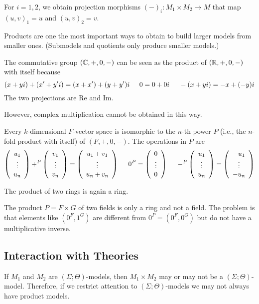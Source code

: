 For $i=1,2$, we obtain projection morphisms $(-)_i:M_1\times M_2\to M$ that map $(u,v)_1=u$ and $(u,v)_2=v$.

\begin{example}
Products are one the most important ways to obtain to build larger models from smaller ones. (Submodels and quotients only produce smaller models.)
\begin{compactitem}
\item The commutative group $(\mathbb{C},+,0,-)$ can be seen as the product of $(\mathbb{R},+,0,-)$ with itself because
\[(x+yi)+(x'+y'i)=(x+x')+(y+y')i\hspace*{.5cm} 0=0+0i\hspace*{.5cm} -(x+yi)=-x+(-y)i\]
The two projections are $\mathrm{Re}$ and $\mathrm{Im}$.

However, complex multiplication cannot be obtained in this way.
\item Every $k$-dimensional $F$-vector space is isomorphic to the $n$-th power $P$ (i.e., the $n$-fold product with itself) of $(F,+,0,-)$.
The operations in $P$ are
\[\left(\begin{array}{c}u_1\\\vdots\\u_n\end{array}\right)+^P\left(\begin{array}{c}v_1\\\vdots\\v_n\end{array}\right)=\left(\begin{array}{c}u_1+v_1\\\vdots\\u_n+v_n\end{array}\right) \hspace*{.5cm}
  0^P=\left(\begin{array}{c}0\\\vdots\\0\end{array}\right)\hspace*{.5cm}
  -^P\left(\begin{array}{c}u_1\\\vdots\\u_n\end{array}\right)=\left(\begin{array}{c}-u_1\\\vdots\\-u_n\end{array}\right)
\]
\item The product of two rings is again a ring.
\item The product $P=F\times G$ of two fields is only a ring and not a field.
The problem is that elements like $(0^F,1^G)$ are different from $0^P=(0^F,0^G)$ but do not have a multiplicative inverse.
\end{compactitem}
\end{example}

\subsection{Interaction with Theories}

If $M_1$ and $M_2$ are $(\Sigma;\Theta)$-models, then $M_1\times M_2$ may or may not be a $(\Sigma;\Theta)$-model.
Therefore, if we restrict attention to $(\Sigma;\Theta)$-models we may not always have product models.


